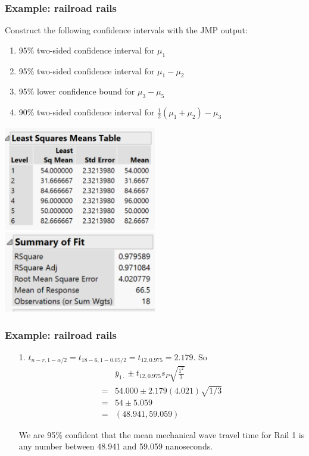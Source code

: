 \documentclass[handout]{beamer}\usepackage[]{graphicx}\usepackage[]{color}
\numberwithin{equation}{section}
\begin{document}
\begin{frame}
\frametitle{Example: railroad rails}
Construct the following confidence intervals with the JMP output:
\begin{enumerate}
\item 95\% two-sided confidence interval for $\mu_1$
\item 95\% two-sided confidence interval for $\mu_1 - \mu_2$
\item 95\% lower confidence bound for $\mu_3 - \mu_5$
\item 90\% two-sided confidence interval for $\frac{1}{2}(\mu_1 + \mu_2) - \mu_3$
\end{enumerate}
\includegraphics[width = 0.5\textwidth]{../../fig/rails_means.png}
\includegraphics[width = 0.5\textwidth]{../../fig/rails_fit.png}
\end{frame}

\begin{frame}
\frametitle{Example: railroad rails}
\begin{itemize}
\item[1.]
$t_{n-r, 1 - \alpha/2} = t_{18 - 6, 1 - 0.05/2} = t_{12, 0.975} = 2.179$. So
\begin{align*}
&\bar{y}_{1\cdot}  \pm t_{12, 0.975} s_P \sqrt{\frac{1^2}{3}}\\ = & 54.000 \pm 2.179(4.021)\sqrt{1/3} \\
=& 54 \pm 5.059\\
= & (48.941, 59.059)
\end{align*}

We are 95\% confident that the mean mechanical wave travel time for Rail 1 is any number between 48.941 and 59.059 nanoseconds.
\end{itemize}
\end{frame}
\end{document}
